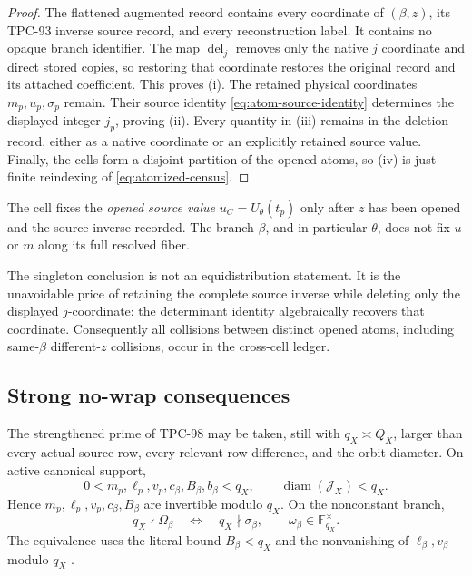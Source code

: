 \begin{proof}
The flattened augmented record contains every coordinate of
\((\beta,z)\), its TPC-93 inverse source record, and every
reconstruction label.  It contains no opaque branch identifier.
The map \(\operatorname{del}_j\) removes only the native \(j\)
coordinate and direct stored copies, so restoring that coordinate
restores the original record and its attached coefficient.  This
proves (i).  The retained physical coordinates
\(m_p,u_p,\sigma_p\) remain.  Their source identity
\eqref{eq:atom-source-identity} determines the displayed integer
\(j_p\), proving (ii).  Every quantity in (iii) remains in the
deletion record, either as a native coordinate or an explicitly
retained source value.  Finally, the cells form a disjoint partition
of the opened atoms, so (iv) is just finite reindexing of
\eqref{eq:atomized-census}.
\end{proof}

\begin{remark}
The cell fixes the \emph{opened source value}
\(u_C=U_\theta(t_p)\) only after \(z\) has been opened and the source
inverse recorded.  The branch \(\beta\), and in particular
\(\theta\), does not fix \(u\) or \(m\) along its full resolved
fiber.
\end{remark}

\begin{remark}
\label{rem:singleton-cells}
The singleton conclusion is not an equidistribution statement.  It
is the unavoidable price of retaining the complete source inverse
while deleting only the displayed \(j\)-coordinate: the determinant
identity algebraically recovers that coordinate.  Consequently all
collisions between distinct opened atoms, including same-\(\beta\)
different-\(z\) collisions, occur in the cross-cell ledger.
\end{remark}

\subsection{Strong no-wrap consequences}

The strengthened prime of TPC-98 may be taken, still with
\(q_X\asymp Q_X\), larger than every actual source row, every
relevant row difference, and the orbit diameter.  On active
canonical support,
\begin{equation}
 0<m_p,\ell_p,v_p,c_\beta,B_\beta,b_\beta<q_X,
\qquad
 \operatorname{diam}(\mathcal J_X)<q_X.
\label{eq:atom-no-wrap}
\end{equation}
Hence \(m_p,\ell_p,v_p,c_\beta,B_\beta\) are invertible modulo
\(q_X\).  On the nonconstant branch,
\begin{equation}
 q_X\nmid\Omega_\beta
 \quad\Longleftrightarrow\quad
 q_X\nmid\sigma_\beta,
\qquad
 \omega_\beta\in\mathbb F_{q_X}^{\times}.
\label{eq:atom-nonconstant}
\end{equation}
The equivalence uses the literal bound \(B_\beta<q_X\) and the
nonvanishing of \(\ell_\beta,v_\beta\) modulo \(q_X\)
\citep{WangTPC98}.
